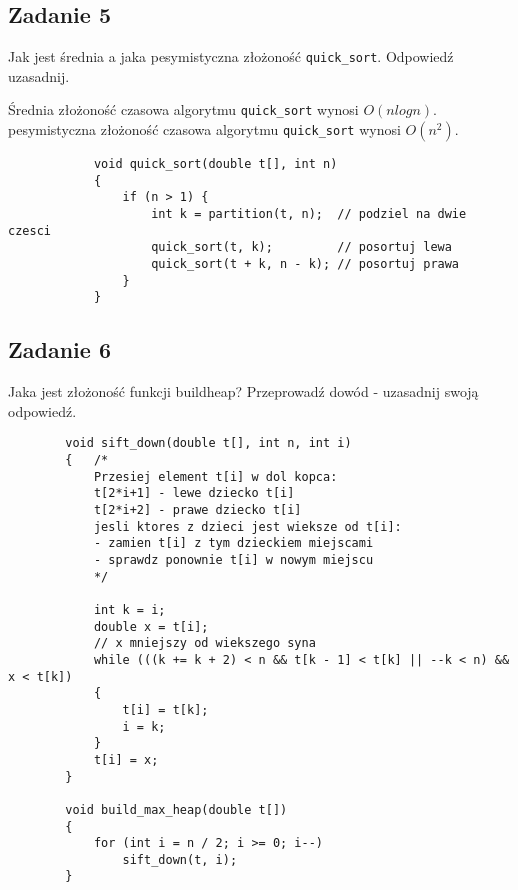\documentclass{article}
\begin{document}
    \pagebreak

    \subsection*{Zadanie 5}
    Jak jest średnia a jaka pesymistyczna złożoność \verb+quick_sort+. Odpowiedź uzasadnij.

    \begin{center}
    Średnia złożoność czasowa algorytmu \verb+quick_sort+ wynosi $O(nlogn)$. \\
    pesymistyczna złożoność czasowa algorytmu \verb+quick_sort+ wynosi $O(n^2)$. \\
    \end{center}

    \begin{lstlisting}
            void quick_sort(double t[], int n)
            {
                if (n > 1) {
                    int k = partition(t, n);  // podziel na dwie czesci
                    quick_sort(t, k);         // posortuj lewa
                    quick_sort(t + k, n - k); // posortuj prawa
                }
            }
    \end{lstlisting}

    \subsection*{Zadanie 6}
    Jaka jest złożoność funkcji buildheap? Przeprowadź dowód - uzasadnij swoją odpowiedź.

    \begin{lstlisting}
        void sift_down(double t[], int n, int i)
        {   /*
            Przesiej element t[i] w dol kopca:
            t[2*i+1] - lewe dziecko t[i]
            t[2*i+2] - prawe dziecko t[i]
            jesli ktores z dzieci jest wieksze od t[i]:
            - zamien t[i] z tym dzieckiem miejscami
            - sprawdz ponownie t[i] w nowym miejscu
            */

            int k = i;
            double x = t[i];
            // x mniejszy od wiekszego syna
            while (((k += k + 2) < n && t[k - 1] < t[k] || --k < n) && x < t[k]) 
            {
                t[i] = t[k];
                i = k;
            }
            t[i] = x;
        }

        void build_max_heap(double t[])
        {
            for (int i = n / 2; i >= 0; i--)
                sift_down(t, i);
        }
    \end{lstlisting}
\end{document}

